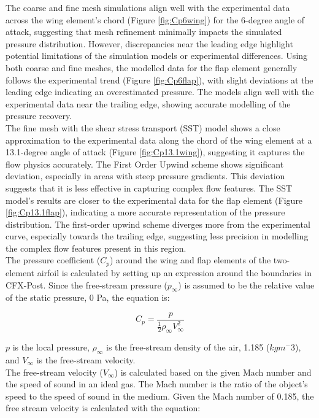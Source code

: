 The coarse and fine mesh simulations align well with the experimental data across the wing element's chord (Figure \ref{fig:Cp6wing}) for the 6-degree angle of attack, suggesting that mesh refinement minimally impacts the simulated pressure distribution. However, discrepancies near the leading edge highlight potential limitations of the simulation models or experimental differences. Using both coarse and fine meshes, the modelled data for the flap element generally follows the experimental trend (Figure \ref{fig:Cp6flap}), with slight deviations at the leading edge indicating an overestimated pressure. The models align well with the experimental data near the trailing edge, showing accurate modelling of the pressure recovery.\\

The fine mesh with the shear stress transport (SST) model shows a close approximation to the experimental data along the chord of the wing element at a 13.1-degree angle of attack (Figure \ref{fig:Cp13.1wing}), suggesting it captures the flow physics accurately. The First Order Upwind scheme shows significant deviation, especially in areas with steep pressure gradients. This deviation suggests that it is less effective in capturing complex flow features. The SST model's results are closer to the experimental data for the flap element (Figure \ref{fig:Cp13.1flap}), indicating a more accurate representation of the pressure distribution. The first-order upwind scheme diverges more from the experimental curve, especially towards the trailing edge, suggesting less precision in modelling the complex flow features present in this region.\\


The pressure coefficient ($C_p$) around the wing and flap elements of the two-element airfoil is calculated by setting up an expression around the boundaries in CFX-Post. Since the free-stream pressure ($p_{\infty}$) is assumed to be the relative value of the static pressure, 0 Pa, the equation is:

\begin{equation}
C_p = \frac{p}{\frac{1}{2} \rho_{\infty} V_{\infty}^2}
\end{equation}

$p$ is the local pressure, $\rho_{\infty}$ is the free-stream density of the air, 1.185 ($kg m^-3$), and $V_{\infty}$ is the free-stream velocity. \\

The free-stream velocity ($V_{\infty}$) is calculated based on the given Mach number and the speed of sound in an ideal gas. The Mach number is the ratio of the object's speed to the speed of sound in the medium. Given the Mach number of 0.185, the free stream velocity is calculated with the equation:

